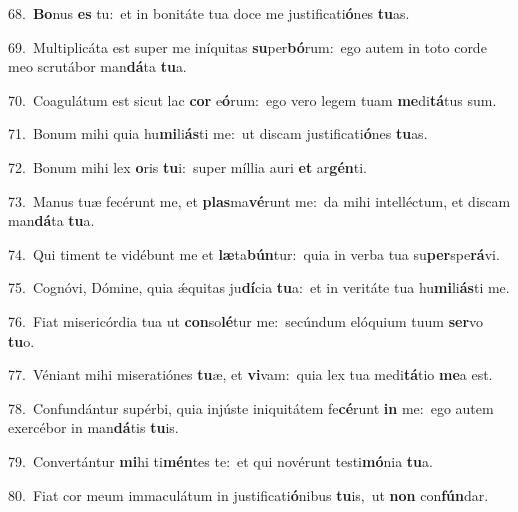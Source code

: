 {\numbfont\textcolor{\numbcolor}{68.}}~\-\textbf{Bo}\-nus \textbf{es} tu:~\star et in bonitáte tua doce me justificati\-\textbf{ó}\-nes \textbf{tu}\-as.\par
{\numbfont\textcolor{\numbcolor}{69.}}~Multiplicáta est super me iníquitas \textbf{su}\-per\-\textbf{bó}\-rum:~\star ego autem in toto corde meo scrutábor man\-\textbf{dá}\-ta \textbf{tu}\-a.\par
{\numbfont\textcolor{\numbcolor}{70.}}~Coagulátum est sicut lac \textbf{cor} e\-\textbf{ó}\-rum:~\star ego vero legem tuam \textbf{me}\-di\-\textbf{tá}\-tus sum.\par
{\numbfont\textcolor{\numbcolor}{71.}}~Bonum mihi quia hu\-\textbf{mi}\-li\-\textbf{ás}\-ti me:~\star ut discam justificati\-\textbf{ó}\-nes \textbf{tu}\-as.\par
{\numbfont\textcolor{\numbcolor}{72.}}~Bonum mihi lex \textbf{o}\-ris \textbf{tu}\-i:~\star super míllia auri \textbf{et} ar\-\textbf{gén}\-ti.\par
{\numbfont\textcolor{\numbcolor}{73.}}~Manus tuæ fecérunt me, et \textbf{plas}\-ma\-\textbf{vé}\-runt me:~\star da mihi intelléctum, et discam man\-\textbf{dá}\-ta \textbf{tu}\-a.\par
{\numbfont\textcolor{\numbcolor}{74.}}~Qui timent te vidébunt me et \textbf{læ}\-ta\-\textbf{bún}\-tur:~\star quia in verba tua su\-\textbf{per}\-spe\-\textbf{rá}\-vi.\par
{\numbfont\textcolor{\numbcolor}{75.}}~Cognóvi, Dómine, quia ǽquitas ju\-\textbf{dí}\-cia \textbf{tu}\-a:~\star et in veritáte tua hu\-\textbf{mi}\-li\-\textbf{ás}\-ti me.\par
{\numbfont\textcolor{\numbcolor}{76.}}~Fiat misericórdia tua ut \textbf{con}\-so\-\textbf{lé}\-tur me:~\star secúndum elóquium tuum \textbf{ser}\-vo \textbf{tu}\-o.\par
{\numbfont\textcolor{\numbcolor}{77.}}~Véniant mihi miseratiónes \textbf{tu}\-æ, et \textbf{vi}\-vam:~\star quia lex tua medi\-\textbf{tá}\-tio \textbf{me}\-a est.\par
{\numbfont\textcolor{\numbcolor}{78.}}~Confundántur supérbi, quia injúste iniquitátem fe\-\textbf{cé}\-runt \textbf{in} me:~\star ego autem exercébor in man\-\textbf{dá}\-tis \textbf{tu}\-is.\par
{\numbfont\textcolor{\numbcolor}{79.}}~Convertántur \textbf{mi}\-hi ti\-\textbf{mén}\-tes te:~\star et qui novérunt testi\-\textbf{mó}\-nia \textbf{tu}\-a.\par
{\numbfont\textcolor{\numbcolor}{80.}}~Fiat cor meum immaculátum in justificati\-\textbf{ó}\-nibus \textbf{tu}\-is,~\star ut \textbf{non} con\-\textbf{fún}\-dar.\par
